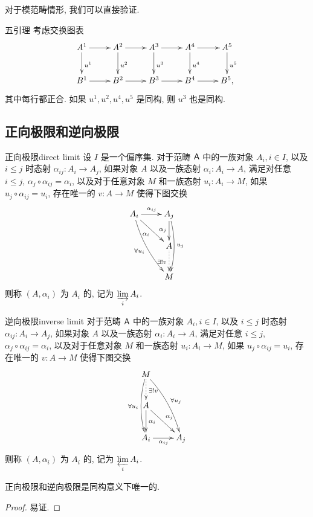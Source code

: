 对于模范畴情形, 我们可以直接验证.

\begin{corollary}{五引理}{}
考虑交换图表
  \[\xymatrix{
    A^1\ar[r]\ar[d]^{u^1}&A^2\ar[r]\ar[d]^{u^2}&
    A^3\ar[r]\ar[d]^{u^3}&A^4\ar[r]\ar[d]^{u^4}&
    A^5\ar[d]^{u^5}\\
    B^1\ar[r]&B^2\ar[r]&B^3\ar[r]&B^4\ar[r]&B^5,
  }\]
其中每行都正合. 如果 $u^1,u^2,u^4,u^5$ 是同构, 则 $u^3$ 也是同构.
\end{corollary}


\subsection{正向极限和逆向极限}

\begin{definition}{正向极限}{direct limit}
设 $I$ 是一个偏序集.
对于范畴 ${\mathsf{A}}$ 中的一族对象 $A_i,i\in I$, 以及 $i
\le j$ 时态射 $\alpha_{ij}:A_i\to A_j$, 如果对象 $A$ 以及一族态射 $\alpha_i:A_i\to A$, 满足对任意 $i\le j$, $\alpha_j\circ\alpha_{ij}=\alpha_i$, 以及对于任意对象 $M$ 和一族态射 $u_i:A_i\to M$, 如果 $u_j\circ \alpha_{ij}=u_i$, 存在唯一的 $v:A\to M$ 使得下图交换
  \[\xymatrix{
A_i\ar[r]^{\alpha_{ij}}\ar[rd]_{\alpha_i}\ar@/_/[rdd]_{\forall u_i}&A_j\ar[d]_{\alpha_j}\ar@/^/[dd]^{u_j}\\
&A\ar@{.>}_{\exists ! v}[d]\\
&M
}\]
则称 $(A,\alpha_i)$ 为 $A_i$ 的, 记为 $\varinjlim\limits_i A_i$.
\end{definition}

\begin{definition}{逆向极限}{inverse limit}
对于范畴 ${\mathsf{A}}$ 中的一族对象 $A_i,i\in I$, 以及 $i\le j$ 时态射 $\alpha_{ij}:A_i\to A_j$, 如果对象 $A$ 以及一族态射 $\alpha_i:A_i\to A$, 满足对任意 $i\le j$, $\alpha_j\circ\alpha_{ij}=\alpha_i$, 以及对于任意对象 $M$ 和一族态射 $u_i:A_i\to M$, 如果 $u_j\circ \alpha_{ij}=u_i$, 存在唯一的 $v:A\to M$ 使得下图交换
  \[\xymatrix{
M\ar@/_/[dd]_{\forall u_i}\ar@/^/[rdd]^{\forall u_j}\ar@{.>}[d]^{\exists ! v}&\\
A\ar[d]^{\alpha_i}\ar[rd]^{\alpha_j}&\\
A_i\ar[r]_{\alpha_{ij}}&A_j
}\]
则称 $(A,\alpha_i)$ 为 $A_i$ 的, 记为 $\varprojlim\limits_i A_i$.
\end{definition}

\begin{proposition}{}{}
正向极限和逆向极限是同构意义下唯一的.
\end{proposition}
\begin{proof}
易证.
\end{proof}

